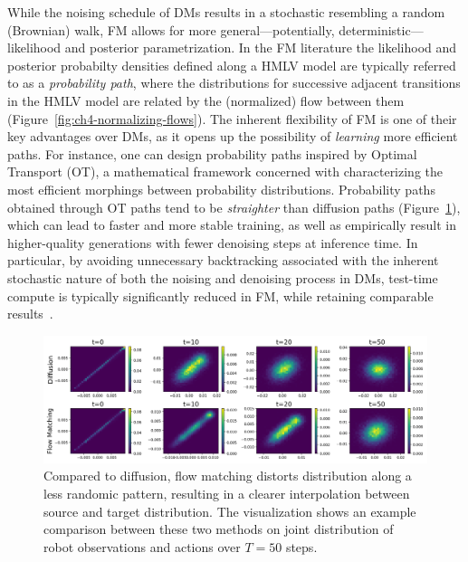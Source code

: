 While the noising schedule of DMs results in a stochastic resembling a random (Brownian) walk, FM allows for more general---potentially, deterministic---likelihood and posterior parametrization.
In the FM literature the likelihood and posterior probabilty densities defined along a HMLV model are typically referred to as a \emph{probability path}, where the distributions for successive adjacent transitions in the HMLV model are related by the (normalized) flow between them (Figure~\ref{fig:ch4-normalizing-flows}).
The inherent flexibility of FM is one of their key advantages over DMs, as it opens up the possibility of \emph{learning} more efficient paths.
For instance, one can design probability paths inspired by Optimal Transport (OT), a mathematical framework concerned with characterizing the most efficient morphings between probability distributions.
Probability paths obtained through OT paths tend to be \emph{straighter} than diffusion paths (Figure~\ref{fig:ch4-diffusion-paths-versus-fm}), which can lead to faster and more stable training, as well as empirically result in higher-quality generations with fewer denoising steps at inference time.
In particular, by avoiding unnecessary backtracking associated with the inherent stochastic nature of both the noising and denoising process in DMs, test-time compute is typically significantly reduced in FM, while retaining comparable results~\citep{lipmanFlowMatchingGenerative2023}.

\begin{figure}
    \centering
    \includegraphics[width=\textwidth]{figures/ch4/ch4-diffusion-vs-flowmatching.png}
    \caption{Compared to diffusion, flow matching distorts distribution along a less randomic pattern, resulting in a clearer interpolation between source and target distribution. The visualization shows an example comparison between these two methods on joint distribution of robot observations and actions over \( T=50 \) steps.}
    \label{fig:ch4-diffusion-paths-versus-fm}
\end{figure}


